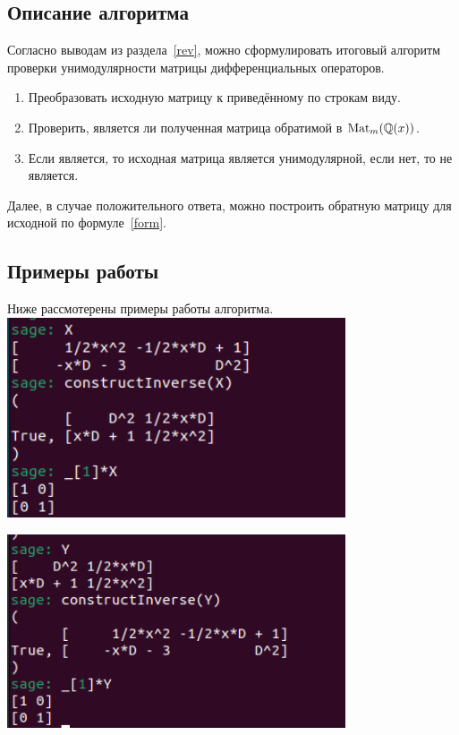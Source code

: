     \subsection{Описание алгоритма}
        Согласно выводам из раздела~\ref{rev}, можно сформулировать итоговый алгоритм 
        проверки унимодулярности матрицы дифференциальных операторов.
        \begin{enumerate}
            \item Преобразовать исходную матрицу к приведённому по строкам виду.
            \item Проверить, является ли полученная матрица обратимой в $\mathop{\mathrm{Mat}}\nolimits_m(\mathbb{Q}(x))$.
            \item Если является, то исходная матрица является унимодулярной, если нет, то не является.
        \end{enumerate}


        Далее, в случае положительного ответа, можно построить обратную матрицу для исходной 
        по формуле~\eqref{form}.

    \subsection{Примеры работы}
        Ниже рассмотерены примеры работы алгоритма.\\

        \includegraphics[width=0.75\textwidth]{im1.png}

        \includegraphics[width=0.75\textwidth]{im2.png}\\


